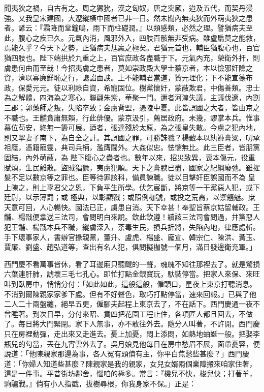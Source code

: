 \begin{showcontents}{}
聞夷狄之禍，自古有之。周之玁狁，漢之匈奴，唐之突厥，迨及五代，而契丹浸強。又我皇宋建國，大遼縱橫中國者已非一日。然未聞內無夷狄而外萌夷狄之患者。諺云：『霜降而堂鐘鳴，雨下而柱礎潤。』以類感類，必然之理。譬猶病夫至此，腹心之疾已久。元氣內消，風邪外入，四肢百骸無非受病。雖盧扁莫之能救，焉能久乎？今天下之勢，正猶病夫尪羸之極矣。君猶元首也，輔臣猶腹心也，百官猶四肢也。陛下端拱於九重之上，百官庶政各盡職于下。元氣內充，榮衛外扞，則虜患何由而至哉！今招夷虜之患者，莫如崇政殿大學士蔡京者，本以憸邪奸險之資，濟以寡廉鮮恥之行，讒諂面諛。上不能輔君當道，贊元理化；下不能宣德布政，保愛元元。徒以利祿自資，希寵固位。樹黨懷奸，蒙蔽欺君，中傷善類。忠士為之解體，四海為之寒心。聯翩朱紫，華聚一門。邇者河湟失議，主議伐遼，內割三郡；郭藥師之叛，失陷卒致；金虜背盟，憑陵中夏。此皆誤國之大者，皆由京之不職也。王黼貪庸無賴，行此俳優。蒙京汲引，薦居政府。未幾，謬掌本兵。惟事慕位苟安，終無一籌可展。迺者，張達殘於太原，為之張皇失散。今虜之犯內地，則又挈妻子南下，為自全之計。其誤國之罪，可勝誅戮？楊戩本以紈褲膏粱，叨承祖廕，憑籍寵靈，典司兵柄，濫膺閫外。大姦似忠。怯懦無比。此三臣者，皆朋黨固結，內外萌蔽，為 陛下腹心之蠱者也。數年以來，招災致異，喪本傷元，役重賦煩，生民離散。盜賊猖獗，夷虜犯順。天下之膏腴已盡，國家之紀綱廢弛。雖擢髮不足以數京等之罪也。臣等待罪該科，備員諫職。徒以目擊奸臣誤國而不為 皇上陳之，則上辜君父之恩，下負平生所學。伏乞宸斷，將京等一干黨惡人犯，或下廷尉，以示薄罰；或 極典，以彰顯戮；或照例枷號，或投之荒裔，以禦魑魅。庶天意可回，人心暢快。國法已正，虜患自消。天下幸甚！奉聖旨蔡京姑留輔政。王黼、楊戩便拿送三法司，會問明白來說。欽此欽遵！續該三法司會問過，并黨惡人犯王黼、楊戩本兵不職，縱虜深入，荼毒生民，損兵折將，失陷內地，律應處斬。手下壞事家人，書辦官掾親黨，董升、盧虎、楊盛、龐宣、韓宗仁、陳洪、黃玉、賈廉、劉盛、趙弘道等，查出有名人犯，俱問擬枷號一個月，滿日發邊衛充軍。」

西門慶不看萬事皆休，看了耳邊廂只聽颼的一聲，魂魄不知往那裡去了。就是驚損六葉連肝肺，諕壞三毛七孔心。即忙打點金銀寶玩，馱裝停當。把家人來保、來旺叫到臥房中，悄悄分付：「如此如此，這般這般，僱頭口，星夜上東京打聽消息。不消到爾陳親家家爹下處。但有不好聲色，取巧打點停當，速來回報。」已與了他二人二十兩盤纏，絕早五更，僱腳夫起程上東京去了，不在話下。西門慶通一夜不曾睡著。到次日早，分付來昭、賁四把花園工程止住，各項匠人都且回去，不做了。每日將大門緊閉。家下人無事，亦不敢往外去。隨分人叫著，不許開。西門慶只在房裡動彈，走出來又走進去。憂上加憂，悶上添悶，如熱地蚰蜒一般。把娶李瓶兒的勾當，丟在九宵雲外去了。吳月娘見他每日在房中愁眉不展，面帶憂容，便說道：「他陳親家那邊為事，各人冤有頭債有主，你平白焦愁些甚麼？」西門慶道：「你婦人知道些甚麼？陳親家是我的親家，女兒女婿兩個業障搬來咱家住著，這是一件事。平昔街坊鄰舍，惱咱的極多。常言：『機兒不快，梭兒快；打著羊，駒驢戰。』倘有小人指戳，拔樹尋根，你我身家不保。」正是：


\end{showcontents}
